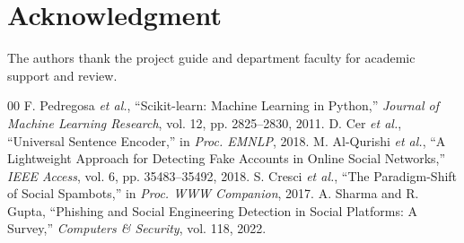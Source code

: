 ﻿\documentclass[conference]{IEEEtran}
\begin{document}
\section*{Acknowledgment}
The authors thank the project guide and department faculty for academic support and review.

\begin{thebibliography}{00}
 F. Pedregosa \textit{et al.}, ``Scikit-learn: Machine Learning in Python,'' \textit{Journal of Machine Learning Research}, vol. 12, pp. 2825--2830, 2011.
 D. Cer \textit{et al.}, ``Universal Sentence Encoder,'' in \textit{Proc. EMNLP}, 2018.
 M. Al-Qurishi \textit{et al.}, ``A Lightweight Approach for Detecting Fake Accounts in Online Social Networks,'' \textit{IEEE Access}, vol. 6, pp. 35483--35492, 2018.
 S. Cresci \textit{et al.}, ``The Paradigm-Shift of Social Spambots,'' in \textit{Proc. WWW Companion}, 2017.
 A. Sharma and R. Gupta, ``Phishing and Social Engineering Detection in Social Platforms: A Survey,'' \textit{Computers \& Security}, vol. 118, 2022.
\end{thebibliography}
\end{document}
